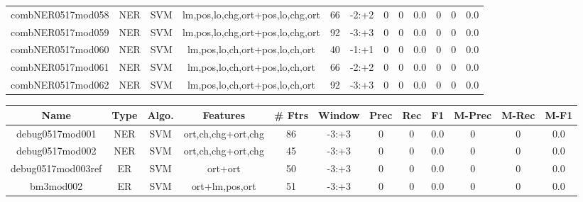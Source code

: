 \documentclass[a4paper]{article}
\begin{document}
\begin{landscape}
\begin{center}
\begin{tabular}{ |c|c|c|c|c|c|c|c|c|c|c|c|}
 
 	
 	\small{ combNER0517mod058 } & NER & SVM & lm,pos,lo,chg,ort+pos,lo,chg,ort  &  66 &  -2:+2  &  0 & 0 & 0.0  &  0 & 0 & 0.0 \\
 	

 
 	
 	\small{ combNER0517mod059 } & NER & SVM & lm,pos,lo,chg,ort+pos,lo,chg,ort  &  92 &  -3:+3  &  0 & 0 & 0.0  &  0 & 0 & 0.0 \\
 	

 
 	
 	\small{ combNER0517mod060 } & NER & SVM & lm,pos,lo,ch,ort+pos,lo,ch,ort  &  40 &  -1:+1  &  0 & 0 & 0.0  &  0 & 0 & 0.0 \\
 	

 
 	
 	\small{ combNER0517mod061 } & NER & SVM & lm,pos,lo,ch,ort+pos,lo,ch,ort  &  66 &  -2:+2  &  0 & 0 & 0.0  &  0 & 0 & 0.0 \\
 	

 
 	
 	\small{ combNER0517mod062 } & NER & SVM & lm,pos,lo,ch,ort+pos,lo,ch,ort  &  92 &  -3:+3  &  0 & 0 & 0.0  &  0 & 0 & 0.0 \\
 	
 \hline
\end{tabular}
\end{center}




\begin{center}
\begin{tabular}{ |c|c|c|c|c|c|c|c|c|c|c|c|} 
 \hline
 	Name & Type & Algo. & Features & \# Ftrs & Window & Prec & Rec & F1 & M-Prec & M-Rec & M-F1\\
 \hline

 	

 
 	
 	\small{ debug0517mod001 } & NER & SVM & ort,ch,chg+ort,chg  &  86 &  -3:+3  &  0 & 0 & 0.0  &  0 & 0 & 0.0 \\
 	

 
 	
 	\small{ debug0517mod002 } & NER & SVM & ort,ch,chg+ort,chg  &  45 &  -3:+3  &  0 & 0 & 0.0  &  0 & 0 & 0.0 \\
 	

 
 	
 	\small{ debug0517mod003ref } & ER & SVM & ort+ort  &  50 &  -3:+3  &  0 & 0 & 0.0  &  0 & 0 & 0.0 \\
 	

 
 	
 	\small{ bm3mod002 } & ER & SVM & ort+lm,pos,ort  &  51 &  -3:+3  &  0 & 0 & 0.0  &  0 & 0 & 0.0 \\
 	


\end{tabular}
\end{center}
\end{landscape}
\end{document}
